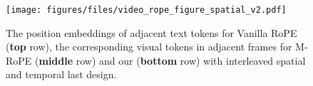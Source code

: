\begin{figure}[t]
\centering
\texttt{[image: figures/files/video\_rope\_figure\_spatial\_v2.pdf]}
\vspace{-6pt}
\caption{\footnotesize The position embeddings of adjacent text tokens for Vanilla RoPE (\textbf{top} row), the corresponding visual tokens in adjacent frames for M-RoPE (\textbf{middle} row) and our \methodname (\textbf{bottom} row) with interleaved spatial and temporal last design.}
\vspace{-12pt}
\label{fig:spatail_index}
\end{figure}